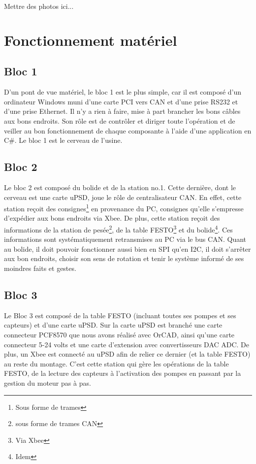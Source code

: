 \documentclass[10pt,a4paper,final]{article}
\begin{document}
\begin{spacing}{1.5}
Mettre des photos ici...

\pagebreak

\section{Fonctionnement matériel}

\subsection{Bloc 1}
D'un pont de vue matériel, le bloc 1 est le plus simple, car il est composé d'un ordinateur Windows muni d'une carte PCI vers CAN et d'une prise RS232 et d'une prise Ethernet. Il n'y a rien à faire, mise à part brancher les bons câbles aux bons endroits. Son rôle est de contrôler et diriger toute l'opération et de veiller au bon fonctionnement de chaque composante à l'aide d'une application en C\#. Le bloc 1 est le cerveau de l'usine.

\subsection{Bloc 2}
Le bloc 2 est composé du bolide et de la station no.1. Cette dernière, dont le cerveau est une carte uPSD, joue le rôle de centralisateur CAN. En effet, cette station reçoit des consignes\footnote{Sous forme de trames} en provenance du PC, consignes qu'elle s'empresse d'expédier aux bons endroits via Xbee. De plus, cette station reçoit des informations de la station de pesée\footnote{sous forme de trames CAN}, de la table FESTO\footnote{Via Xbee} et du bolide\footnote{Idem}. Ces informations sont systématiquement retransmises au PC via le bus CAN. Quant au bolide, il doit pouvoir fonctionner aussi bien en SPI qu'en I2C, il doit s'arrêter aux bon endroits, choisir son sens de rotation et tenir le système informé de ses moindres faits et gestes.

\subsection{Bloc 3}
Le Bloc 3 est composé de la table FESTO (incluant toutes ses pompes et ses capteurs) et d'une carte uPSD. Sur la carte uPSD est branché une carte connecteur PCF8570 que nous avons réalisé avec OrCAD, ainsi qu'une carte connecteur 5-24 volts et une carte d'extension avec convertisseurs DAC ADC. De plus, un Xbee est connecté au uPSD afin de relier ce dernier (et la table FESTO) au reste du montage. C'est cette station qui gère les opérations de la table FESTO, de la lecture des capteurs à l'activation des pompes en passant par la gestion du moteur pas à pas.


\end{spacing}
\end{document}
